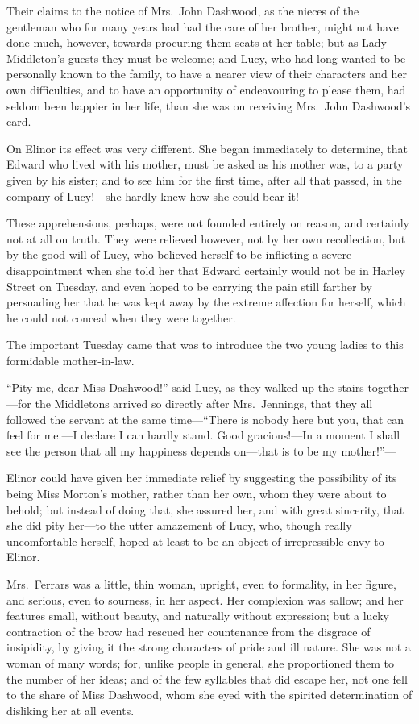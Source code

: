 \documentclass{article}
\begin{document}
Their claims to the notice of Mrs.\ John Dashwood,
as the nieces of the gentleman who for many years had
had the care of her brother, might not have done much,
however, towards procuring them seats at her table;
but as Lady Middleton's guests they must be welcome; and Lucy,
who had long wanted to be personally known to the family,
to have a nearer view of their characters and her own
difficulties, and to have an opportunity of endeavouring
to please them, had seldom been happier in her life,
than she was on receiving Mrs.\ John Dashwood's card.

On Elinor its effect was very different.  She began
immediately to determine, that Edward who lived with
his mother, must be asked as his mother was, to a party
given by his sister; and to see him for the first time,
after all that passed, in the company of Lucy!---she hardly
knew how she could bear it!

These apprehensions, perhaps, were not founded
entirely on reason, and certainly not at all on truth.
They were relieved however, not by her own recollection,
but by the good will of Lucy, who believed herself to be
inflicting a severe disappointment when she told her
that Edward certainly would not be in Harley Street on Tuesday,
and even hoped to be carrying the pain still farther
by persuading her that he was kept away by the extreme
affection for herself, which he could not conceal when they
were together.

The important Tuesday came that was to introduce
the two young ladies to this formidable mother-in-law.

``Pity me, dear Miss Dashwood!'' said Lucy, as they
walked up the stairs together---for the Middletons arrived
so directly after Mrs.\ Jennings, that they all followed
the servant at the same time---``There is nobody here but
you, that can feel for me.---I declare I can hardly stand.
Good gracious!---In a moment I shall see the person that all
my happiness depends on---that is to be my mother!''---%

Elinor could have given her immediate relief
by suggesting the possibility of its being Miss Morton's mother,
rather than her own, whom they were about to behold;
but instead of doing that, she assured her, and with
great sincerity, that she did pity her---to the utter
amazement of Lucy, who, though really uncomfortable herself,
hoped at least to be an object of irrepressible envy to Elinor.

Mrs.\ Ferrars was a little, thin woman, upright,
even to formality, in her figure, and serious,
even to sourness, in her aspect.  Her complexion was sallow;
and her features small, without beauty, and naturally
without expression; but a lucky contraction of the brow
had rescued her countenance from the disgrace of insipidity,
by giving it the strong characters of pride and ill nature.
She was not a woman of many words; for, unlike people
in general, she proportioned them to the number of
her ideas; and of the few syllables that did escape her,
not one fell to the share of Miss Dashwood, whom she eyed
with the spirited determination of disliking her at all events.
\end{document}
